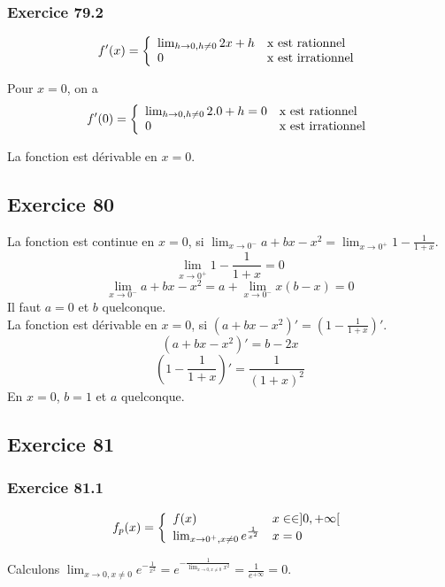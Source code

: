\documentclass[]{book}
\theoremstyle{definition}
\begin{document}
\subsubsection*{Exercice 79.2}
$$f'(x) = 
\left\{ 
\begin{array}{l l}
\lim_{h \to 0, h \neq 0} 2x+h & \textrm{x est rationnel}\\
0 & \textrm{x est irrationnel}\\
\end{array}
\right. 
$$

Pour $x=0$, on a 
$$f'(0) = 
\left\{ 
\begin{array}{l l}
\lim_{h \to 0, h \neq 0} 2.0+h = 0 & \textrm{x est rationnel}\\
0 & \textrm{x est irrationnel}\\
\end{array}
\right. 
$$

La fonction est d\'erivable en $x=0$.


\subsection*{Exercice 80}
La fonction est continue en $x=0$, si $\lim_{x \to 0^{-}} a + bx -x^2 = \lim_{x \to 0^{+}} 1 - \frac{1}{1+x}$.
$$\lim_{x \to 0^{+}} 1 - \frac{1}{1+x} = 0$$
$$\lim_{x \to 0^{-}} a + bx -x^2 = a + \lim_{x \to 0^{-}} x(b-x) = 0$$
Il faut $a=0$ et $b$ quelconque.\\

La fonction est d\'erivable en $x=0$, si $(a + bx -x^2)' = \left(1 - \frac{1}{1+x}\right)'$.
$$(a + bx -x^2)' = b-2x$$
$$\left(1 - \frac{1}{1+x}\right)' = \frac{1}{(1+x)^2}$$
En $x=0$, $b=1$ et $a$ quelconque.


\subsection*{Exercice 81}
\subsubsection*{Exercice 81.1}
$$f_p(x) =
\left\{ 
\begin{array}{l l}
f(x) & x \in \in ]0,+\infty[ \\
\lim_{x \to 0^{+}, x \neq 0} e^{\frac{1}{x^2}} & x = 0\\
\end{array}
\right. 
$$ 

Calculons $\lim_{x \to 0, x \neq 0} e^{-\frac{1}{x^2}} = e^{-\frac{1}{\lim_{x \to 0, x \neq 0} x^2}} = \frac{1}{e^{+\infty}} = 0$.
\end{document}
